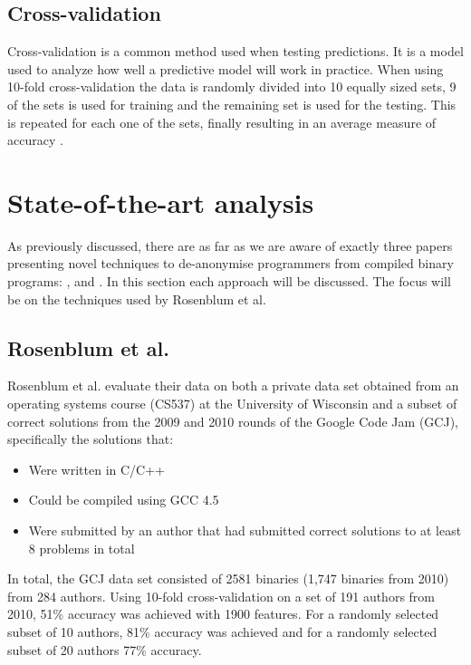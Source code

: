 \documentclass[a4paper,11pt]{kth-mag}
\begin{document}
\subsection{Cross-validation}
Cross-validation is a common method used when testing predictions. It is a
model used to analyze how well a predictive model will work in practice. When
using 10-fold cross-validation the data is randomly divided into 10 equally
sized sets, 9 of the sets is used for training and the remaining set is used
for the testing. This is repeated for each one of the sets, finally resulting
in an average measure of accuracy \parencite{hsu2003practical}.        

\section{State-of-the-art analysis}
As previously discussed, there are as far as we are aware of exactly three
papers presenting novel techniques to de-anonymise programmers from compiled
binary programs: \parencite{rosenblum2011wrote}, \parencite{alrabaee2014oba2}
and \parencite{caliskan2015coding}. In this section each approach will be discussed.
The focus will be on the techniques used by Rosenblum et al.

\subsection{Rosenblum et al.}
Rosenblum et al. evaluate their data on both a private data set obtained from
an operating systems course (CS537) at the University of Wisconsin and a subset
of correct solutions from the 2009 and 2010 rounds of the Google Code Jam
(GCJ), specifically the solutions that:

\begin{itemize}
\item Were written in C/C++
\item Could be compiled using GCC 4.5 
\item Were submitted by an author that had submitted correct solutions to at
      least 8 problems in total
\end{itemize}

In total, the GCJ data set consisted of 2581 binaries (1,747 binaries from
2010) from 284 authors. Using 10-fold cross-validation on a set of 191 authors
from 2010, 51\% accuracy was achieved with 1900 features. For a randomly selected subset of 10
authors, 81\% accuracy was achieved and for a randomly selected subset of 20
authors 77\% accuracy.
\end{document}

